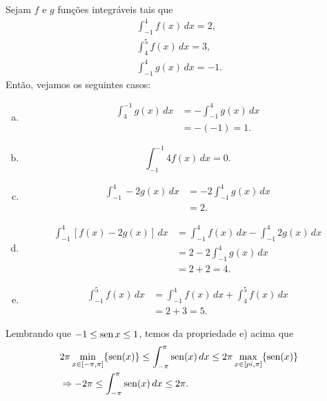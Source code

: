 \begin{ex}
  Sejam $f$ e $g$ funções integráveis tais que
  \begin{gather}
    \int_{-1}^4 f(x)\,dx = 2,\\
    \int_4^5 f(x)\,dx = 3,\\
    \int_{-1}^4 g(x)\,dx = -1.
  \end{gather}
  Então, vejamos os seguintes casos:
  \begin{enumerate}[a)]
  \item
    \begin{align}
      \int_{4}^{-1} g(x)\,dx &= -\int_{-1}^4 g(x)\,dx\\
      &= -(-1) = 1.
    \end{align}
  \item
    \begin{equation}
      \int_{-1}^{-1} 4f(x)\,dx = 0.
    \end{equation}
  \item
    \begin{align}
      \int_{-1}^{4} -2g(x)\,dx &= -2\int_{-1}^4 g(x)\,dx\\
                               &= 2.
    \end{align}
  \item
    \begin{align}
      \int_{-1}^{4} \left[f(x) - 2g(x)\right]\,dx &= \int_{-1}^{4} f(x)\,dx - \int_{-1}^4 2g(x)\,dx \\
                                                  &= 2 - 2\int_{-1}^4 g(x)\,dx \\
                                                  &= 2 + 2 = 4.
    \end{align}
  \item
    \begin{align}
      \int_{-1}^5 f(x)\,dx &= \int_{-1}^4 f(x)\,dx + \int_{4}^5 f(x)\,dx \\
                           &= 2 + 3 = 5.
    \end{align}
  \end{enumerate}
\end{ex}

\begin{ex}
  Lembrando que $-1 \leq \operatorname{sen} x \leq 1$, temos da propriedade e) acima que
  \begin{equation}
    \begin{aligned}
      &2\pi \min_{x\in [-\pi, \pi]} \{\operatorname{sen}(x)\} \leq \int_{-\pi}^\pi \operatorname{sen}(x)\,dx \leq 2\pi \max_{x\in [\-pi, \pi]} \{\operatorname{sen}(x)\} \\
      &\Rightarrow -2\pi \leq \int_{-\pi}^\pi \operatorname{sen}(x)\,dx \leq 2\pi.
    \end{aligned}
\end{equation}
\end{ex}

